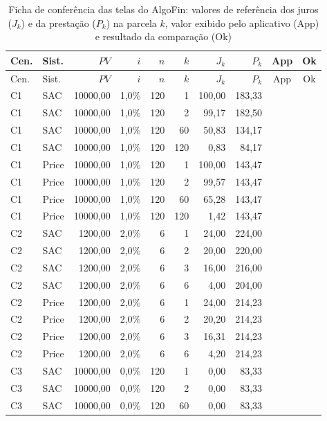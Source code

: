 \begin{longtable}{llrrrrrrcc}
\caption{Ficha de conferência das telas do AlgoFin: valores de referência dos juros ($J_k$) e da prestação ($P_k$) na parcela $k$, valor exibido pelo aplicativo (App) e resultado da comparação (Ok)}\label{tab:ficha-app}\\
\hline
Cen. & Sist. & $PV$ & $i$ & $n$ & $k$ & $J_k$ & $P_k$ & App & Ok \\
\hline
\endfirsthead
\hline
Cen. & Sist. & $PV$ & $i$ & $n$ & $k$ & $J_k$ & $P_k$ & App & Ok \\
\hline
\endhead
C1 & SAC & 10000,00 & 1,0\% & 120 & 1 & 100,00 & 183,33 & & \\
C1 & SAC & 10000,00 & 1,0\% & 120 & 2 & 99,17 & 182,50 & & \\
C1 & SAC & 10000,00 & 1,0\% & 120 & 60 & 50,83 & 134,17 & & \\
C1 & SAC & 10000,00 & 1,0\% & 120 & 120 & 0,83 & 84,17 & & \\
C1 & Price & 10000,00 & 1,0\% & 120 & 1 & 100,00 & 143,47 & & \\
C1 & Price & 10000,00 & 1,0\% & 120 & 2 & 99,57 & 143,47 & & \\
C1 & Price & 10000,00 & 1,0\% & 120 & 60 & 65,28 & 143,47 & & \\
C1 & Price & 10000,00 & 1,0\% & 120 & 120 & 1,42 & 143,47 & & \\
C2 & SAC & 1200,00 & 2,0\% & 6 & 1 & 24,00 & 224,00 & & \\
C2 & SAC & 1200,00 & 2,0\% & 6 & 2 & 20,00 & 220,00 & & \\
C2 & SAC & 1200,00 & 2,0\% & 6 & 3 & 16,00 & 216,00 & & \\
C2 & SAC & 1200,00 & 2,0\% & 6 & 6 & 4,00 & 204,00 & & \\
C2 & Price & 1200,00 & 2,0\% & 6 & 1 & 24,00 & 214,23 & & \\
C2 & Price & 1200,00 & 2,0\% & 6 & 2 & 20,20 & 214,23 & & \\
C2 & Price & 1200,00 & 2,0\% & 6 & 3 & 16,31 & 214,23 & & \\
C2 & Price & 1200,00 & 2,0\% & 6 & 6 & 4,20 & 214,23 & & \\
C3 & SAC & 10000,00 & 0,0\% & 120 & 1 & 0,00 & 83,33 & & \\
C3 & SAC & 10000,00 & 0,0\% & 120 & 2 & 0,00 & 83,33 & & \\
C3 & SAC & 10000,00 & 0,0\% & 120 & 60 & 0,00 & 83,33 & & \\

\end{longtable}
